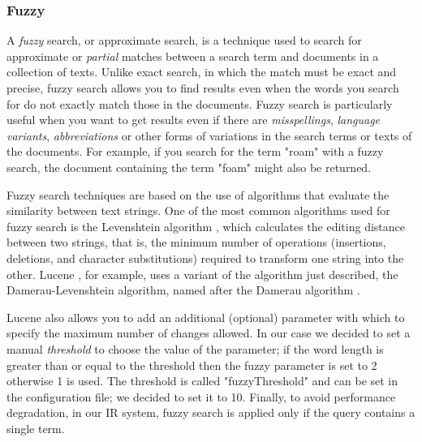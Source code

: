\subsubsection{Fuzzy}
\label{subsubsec:fuzzy}


A \emph{fuzzy} search, or approximate search, is a technique used to search for approximate or \emph{partial} matches between a search term and documents in a collection of texts. Unlike exact search, in which the match must be exact and precise, fuzzy search allows you to find results even when the words you search for do not exactly match those in the documents.
Fuzzy search is particularly useful when you want to get results even if there are \emph{misspellings}, \emph{language variants}, \emph{abbreviations} or other forms of variations in the search terms or texts of the documents. For example, if you search for the term "roam" with a fuzzy search, the document containing the term "foam" might also be returned.

Fuzzy search techniques are based on the use of algorithms that evaluate the similarity between text strings. One of the most common algorithms used for fuzzy search is the Levenshtein algorithm \citep{levenshtein1966binary}, which calculates the editing distance between two strings, that is, the minimum number of operations (insertions, deletions, and character substitutions) required to transform one string into the other. Lucene \citep{Lucene}, for example, uses a variant of the algorithm just described, the Damerau-Levenshtein algorithm, named after the Damerau algorithm \citep{damerau1964technique}.

Lucene \citep{Lucene} also allows you to add an additional (optional) parameter with which to specify the maximum number of changes allowed. In our case we decided to set a manual \emph{threshold} to choose the value of the parameter; if the word length is greater than or equal to the threshold then the fuzzy parameter is set to 2 otherwise 1 is used. The threshold is called "fuzzyThreshold" and can be set in the configuration file; we decided to set it to 10.
Finally, to avoid performance degradation, in our IR system, fuzzy search is applied only if the query contains a single term.
